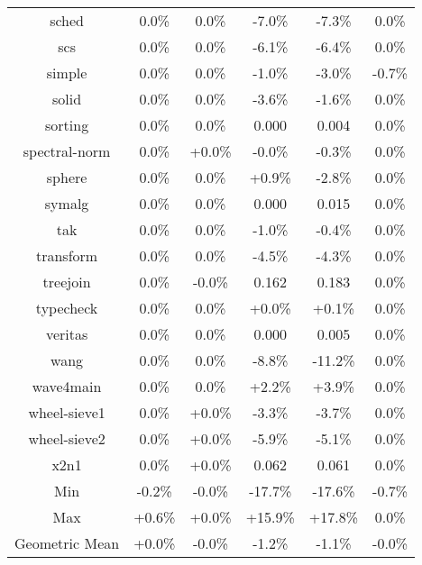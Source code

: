 \begin{tabular}{ c c c c c c }
sched &  0.0\% &  0.0\% & -7.0\% & -7.3\% &  0.0\%\\
scs &  0.0\% &  0.0\% & -6.1\% & -6.4\% &  0.0\%\\
simple &  0.0\% &  0.0\% & -1.0\% & -3.0\% & -0.7\%\\
solid &  0.0\% &  0.0\% & -3.6\% & -1.6\% &  0.0\%\\
sorting &  0.0\% &  0.0\% & 0.000 & 0.004 &  0.0\%\\
spectral-norm &  0.0\% & +0.0\% & -0.0\% & -0.3\% &  0.0\%\\
sphere &  0.0\% &  0.0\% & +0.9\% & -2.8\% &  0.0\%\\
symalg &  0.0\% &  0.0\% & 0.000 & 0.015 &  0.0\%\\
tak &  0.0\% &  0.0\% & -1.0\% & -0.4\% &  0.0\%\\
transform &  0.0\% &  0.0\% & -4.5\% & -4.3\% &  0.0\%\\
treejoin &  0.0\% & -0.0\% & 0.162 & 0.183 &  0.0\%\\
typecheck &  0.0\% &  0.0\% & +0.0\% & +0.1\% &  0.0\%\\
veritas &  0.0\% &  0.0\% & 0.000 & 0.005 &  0.0\%\\
wang &  0.0\% &  0.0\% & -8.8\% & -11.2\% &  0.0\%\\
wave4main &  0.0\% &  0.0\% & +2.2\% & +3.9\% &  0.0\%\\
wheel-sieve1 &  0.0\% & +0.0\% & -3.3\% & -3.7\% &  0.0\%\\
wheel-sieve2 &  0.0\% & +0.0\% & -5.9\% & -5.1\% &  0.0\%\\
x2n1 &  0.0\% & +0.0\% & 0.062 & 0.061 &  0.0\%\\
\hline
Min & -0.2\% & -0.0\% & -17.7\% & -17.6\% & -0.7\%\\
Max & +0.6\% & +0.0\% & +15.9\% & +17.8\% &  0.0\%\\
Geometric Mean & +0.0\% & -0.0\% & -1.2\% & -1.1\% & -0.0\%\\


\end{tabular}
